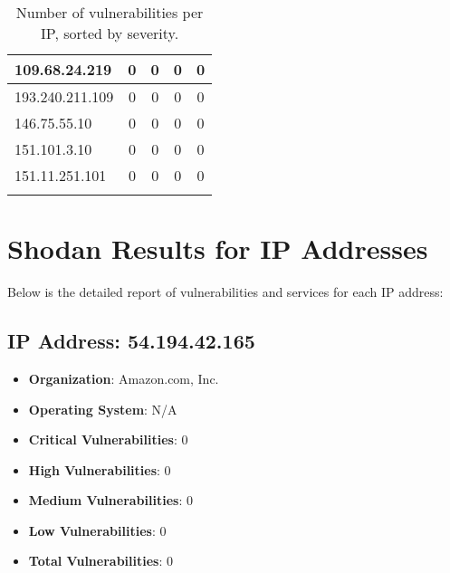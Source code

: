 \documentclass{article}
\begin{document}
\begin{longtable}{|>{\raggedright\arraybackslash}p{3cm}|c|c|c|c|}
    
    \rowcolor{lightgreen} %
    
    109.68.24.219 & 0 & 0 & 0 & 0 \\
    \hline
    
    
    \rowcolor{lightgreen} %
    
    193.240.211.109 & 0 & 0 & 0 & 0 \\
    \hline
    
    
    \rowcolor{lightgreen} %
    
    146.75.55.10 & 0 & 0 & 0 & 0 \\
    \hline
    
    
    \rowcolor{lightgreen} %
    
    151.101.3.10 & 0 & 0 & 0 & 0 \\
    \hline
    
    
    \rowcolor{lightgreen} %
    
    151.11.251.101 & 0 & 0 & 0 & 0 \\
    \hline
    
    \caption{Number of vulnerabilities per IP, sorted by severity.} \\
\end{longtable}

\section*{Shodan Results for IP Addresses}

Below is the detailed report of vulnerabilities and services for each IP address:



\subsection*{IP Address: 54.194.42.165}

\begin{itemize}
    \item \textbf{Organization}: Amazon.com, Inc.
    \item \textbf{Operating System}:  N/A 
    \item \textbf{Critical Vulnerabilities}: 0
    \item \textbf{High Vulnerabilities}: 0
    \item \textbf{Medium Vulnerabilities}: 0
    \item \textbf{Low Vulnerabilities}: 0
    \item \textbf{Total Vulnerabilities}: 0
\end{itemize}
\end{document}
